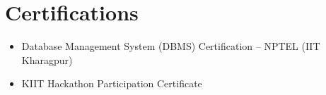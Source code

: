 \documentclass[letterpaper,10pt]{article}
\begin{document}
\section{Certifications}
\begin{itemize}[leftmargin=0.15in, noitemsep, topsep=1pt, partopsep=0pt]
\item Database Management System (DBMS) Certification -- NPTEL (IIT Kharagpur)
\item KIIT Hackathon Participation Certificate
\end{itemize}
\end{document}
